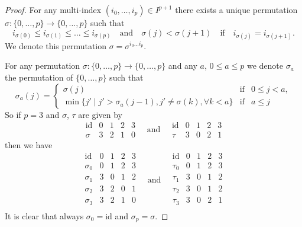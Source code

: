 \begin{proof}
For any multi-index $(i_0, \ldots, i_p) \in I^{p + 1}$ there exists
a unique permutation $\sigma : \{0, \ldots, p\} \to \{0, \ldots, p\}$
such that
$$
i_{\sigma(0)} \leq i_{\sigma(1)} \leq \ldots \leq i_{\sigma(p)}
\quad
\text{and}
\quad
\sigma(j) < \sigma(j + 1)
\quad
\text{if}
\quad
i_{\sigma(j)} = i_{\sigma(j + 1)}.
$$
We denote this permutation $\sigma = \sigma^{i_0 \ldots i_p}$.

\medskip\noindent
For any permutation $\sigma : \{0, \ldots, p\} \to \{0, \ldots, p\}$
and any $a$, $0 \leq a \leq p$ we denote $\sigma_a$
the permutation of $\{0, \ldots, p\}$ such that
$$
\sigma_a(j) =
\left\{
\begin{matrix}
\sigma(j) & \text{if} & 0 \leq j < a, \\
\min\{j' \mid j' > \sigma_a(j - 1), j' \not = \sigma(k), \forall k < a\}
& \text{if} & a \leq j
\end{matrix}
\right.
$$
So if $p = 3$ and $\sigma$, $\tau$ are given by
$$
\begin{matrix}
\text{id} & 0 & 1 & 2 & 3 \\
\sigma & 3 & 2 & 1 & 0
\end{matrix}
\quad \text{and} \quad
\begin{matrix}
\text{id} & 0 & 1 & 2 & 3 \\
\tau & 3 & 0 & 2 & 1
\end{matrix}
$$
then we have
$$
\begin{matrix}
\text{id} & 0 & 1 & 2 & 3 \\
\sigma_0 & 0 & 1 & 2 & 3 \\
\sigma_1 & 3 & 0 & 1 & 2 \\
\sigma_2 & 3 & 2 & 0 & 1 \\
\sigma_3 & 3 & 2 & 1 & 0 \\
\end{matrix}
\quad \text{and} \quad
\begin{matrix}
\text{id} & 0 & 1 & 2 & 3 \\
\tau_0 & 0 & 1 & 2 & 3 \\
\tau_1 & 3 & 0 & 1 & 2 \\
\tau_2 & 3 & 0 & 1 & 2 \\
\tau_3 & 3 & 0 & 2 & 1 \\
\end{matrix}
$$
It is clear that always $\sigma_0 = \text{id}$ and $\sigma_p = \sigma$.


\end{proof}
